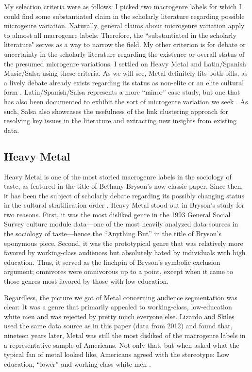 \documentclass[a4paper,12pt]{extarticle}
\begin{document}
My selection criteria were as follows: I picked two macrogenre labels for which I could find some substantiated claim in the scholarly literature regarding possible microgenre variation. Naturally, general claims about microgenre variation apply to almost all macrogenre labels. Therefore, the ``substantiated in the scholarly literature" serves as a way to narrow the field. My other criterion is for debate or uncertainty in the scholarly literature regarding the existence or overall status of the presumed microgenre variations. I settled on Heavy Metal and Latin/Spanish Music/Salsa using these criteria. As we will see, Metal definitely fits both bills, as a lively debate already exists regarding its status as non-elite or an elite cultural form \citep{tampubolon2008revisiting}. Latin/Spanish/Salsa represents a more ``minor'' case study, but one that has also been documented to exhibit the sort of microgenre variation we seek \citep{Bachmayer2014-pk}. As such, Salsa also showcases the usefulness of the link clustering approach for resolving key issues in the literature and extracting new insights from existing data.

\subsection{Heavy Metal}
Heavy Metal is one of the most storied macrogenre labels in the sociology of taste, as featured in the title of Bethany Bryson's \citeyearpar{bryson96} now classic paper. Since then, it has been the subject of scholarly debate regarding its possibly changing status in the cultural stratification order \citep{tampubolon2008revisiting, goldberg2011mapping, lizardo_skiles15}. Heavy Metal stood out in Bryson's study for two reasons. First, it was the most disliked genre in the 1993 General Social Survey culture module data---one of the most heavily analyzed data sources in the sociology of taste---hence the ``Anything But'' in the title of Bryson's eponymous piece. Second, it was the prototypical genre that was relatively more favored by working-class audiences but absolutely hated by individuals with high education. Thus, it served as the linchpin of Bryson's symbolic exclusion argument; omnivores were omnivorous up to a point, except when it came to those genres most favored by those with low education. 

Regardless, the picture we got of Metal concerning audience segmentation was clear: It was a genre that primarily appealed to working-class, low-education white men and was rejected by pretty much everyone else. Lizardo and Skiles \citeyearpar[][6, table 2]{lizardo_skiles16} used the same data source as in this paper (data from 2012) and found that, nineteen years later, Metal was still the most disliked of the macrogenre labels in a representative sample of Americans. Not only that, but when asked what the typical fan of metal looked like, Americans agreed with the stereotype: Low education, ``lower'' and working-class white men \citep[][7, table 3]{lizardo_skiles16}. 
\end{document}
